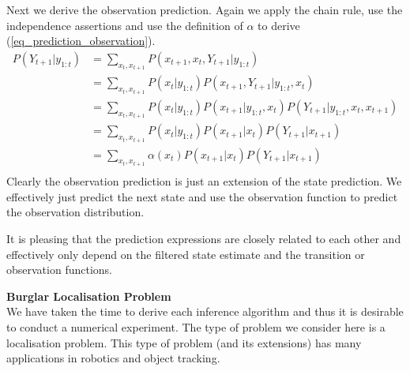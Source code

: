 \documentclass[../masters.tex]{subfiles}
\begin{document}
Next we derive the observation prediction. Again we apply the chain rule, use the independence assertions and use the definition of $\alpha$ to derive (\ref{eq_prediction_observation}).
\begin{equation}
\begin{aligned}
P(Y_{t+1}|y_{1:t}) &= \sum_{x_t, x_{t+1}} P(x_{t+1}, x_t, Y_{t+1}|y_{1:t})\\
&= \sum_{x_t, x_{t+1}} P(x_t|y_{1:t})P(x_{t+1}, Y_{t+1}|y_{1:t}, x_t) \\
&= \sum_{x_t, x_{t+1}} P(x_t|y_{1:t})P(x_{t+1}|y_{1:t}, x_t)P(Y_{t+1}|y_{1:t}, x_t, x_{t+1}) \\
&= \sum_{x_t, x_{t+1}} P(x_t|y_{1:t})P(x_{t+1}|x_t)P(Y_{t+1}|x_{t+1}) \\
&= \sum_{x_t, x_{t+1}} \alpha(x_t)P(x_{t+1}|x_t)P(Y_{t+1}|x_{t+1}) \\
\end{aligned}
\label{eq_prediction_observation}
\end{equation}
Clearly the observation prediction is just an extension of the state prediction. We effectively just predict the next state and use the observation function to predict the observation distribution.

It is pleasing that the prediction expressions are closely related to each other and effectively only depend on the filtered state estimate and the transition or observation functions.

\textbf{Burglar Localisation Problem} \\
We have taken the time to derive each inference algorithm and thus it is desirable to conduct a numerical experiment. The type of problem we consider here is a localisation problem. This type of problem (and its extensions) has many applications in robotics and object tracking.
\end{document}
